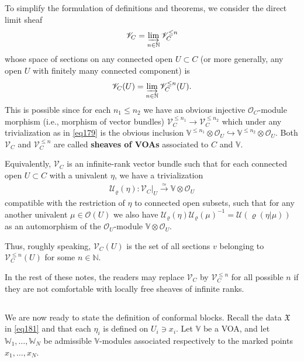 \documentclass[11pt,b5paper,notitlepage]{article}
\theoremstyle{definition}
\theoremstyle{plain}
\newcommand{\fk}{\mathfrak}
\newcommand{\mc}{\mathcal}
\newcommand{\scr}{\mathscr}
\newcommand{\Vbb}{\mathbb V}
\newcommand{\Wbb}{\mathbb W}
\newcommand{\Nbb}{\mathbb N}
\numberwithin{equation}{section}
\begin{document}
To simplify the formulation of definitions and theorems, we consider the direct limit sheaf \index{V@$\scr V_C^{\leq n},\scr V_C$}
\begin{align*}
\scr V_C=\varinjlim_{n\in\Nbb}\scr V^{\leq n}_C	
\end{align*}
whose space of sections on any connected open $U\subset C$ (or more generally, any open $U$ with finitely many connected component) is
\begin{align*}
\scr V_C(U)=\varinjlim_{n\in\Nbb}\scr V^{\leq n}_C(U).
\end{align*}
This is possible since for each $n_1\leq n_2$ we have an obvious injective $\scr O_C$-module morphism (i.e., morphism of vector bundles) $\scr V^{\leq n_1}_C\rightarrow\scr V^{\leq n_2}_C$ which under any trivialization as in \eqref{eq179} is the obvious inclusion $\Vbb^{\leq n_1}\otimes\scr O_U\hookrightarrow\Vbb^{\leq n_2}\otimes\scr O_U$. Both $\scr V_C$ and $\scr V_C^{\leq n}$ are called \textbf{sheaves of VOAs} associated to $C$ and $\Vbb$.


Equivalently, $\scr V_C$ is an infinite-rank vector bundle such that for each connected open $U\subset C$ with a univalent $\eta$, we have a trivialization
\begin{align*}
\mc U_\varrho(\eta)	:\scr V_C|_U\xrightarrow{\simeq}\Vbb\otimes\scr O_U
\end{align*}
compatible with the restriction of $\eta$ to connected open subsets, such that for any another univalent $\mu\in\scr O(U)$ we also have $\mc U_\varrho(\eta)\mc U_\varrho(\mu)^{-1}=\mc U(\varrho(\eta|\mu))$ as an automorphism of the $\scr O_U$-module $\Vbb\otimes\scr O_U$.


Thus, roughly speaking, $\scr V_C(U)$ is the set of all sections $v$ belonging to $\scr V_C^{\leq n}(U)$ for some $n\in\Nbb$.

In the rest of these notes, the readers may replace $\scr V_C$ by  $\scr V_C^{\leq n}$ for all possible $n$ if they are not comfortable with  locally free sheaves of infinite ranks.




\subsection{}

We are now ready to state the definition of conformal blocks. Recall the data $\fk X$ in \eqref{eq181} and that each $\eta_i$ is defined on $U_i\ni x_i$. Let $\Vbb$ be a VOA, and let $\Wbb_1,\dots,\Wbb_N$ be admissible $\Vbb$-modules associated respectively to the marked points $x_1,\dots,x_N$.
\end{document}
